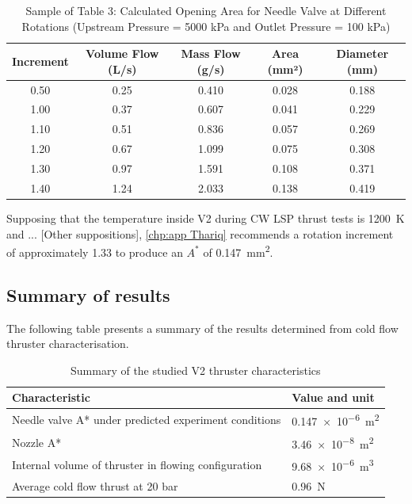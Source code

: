             \begin{table}[!ht]
                \centering
                \caption{Sample of Table 3: Calculated Opening Area for Needle Valve at Different Rotations (Upstream Pressure = 5000 kPa and Outlet Pressure = 100 kPa)}
                \label{tab:opening_area}
                \begin{tabular}{|c|c|c|c|c|}
                \hline
                \textbf{Increment} & \textbf{Volume Flow (L/s)} & \textbf{Mass Flow (g/s)} & \textbf{Area (mm²)} & \textbf{Diameter (mm)} \\ \hline
                0.50 & 0.25 & 0.410 & 0.028 & 0.188 \\ \hline
                1.00 & 0.37 & 0.607 & 0.041 & 0.229 \\ \hline
                1.10 & 0.51 & 0.836 & 0.057 & 0.269 \\ \hline
                1.20 & 0.67 & 1.099 & 0.075 & 0.308 \\ \hline
                1.30 & 0.97 & 1.591 & 0.108 & 0.371 \\ \hline
                1.40 & 1.24 & 2.033 & 0.138 & 0.419 \\ \hline
                \end{tabular}
            \end{table}

            Supposing that the temperature inside V2 during CW LSP thrust tests is \qty{1200}{K} and ... [Other suppositions], \autoref{chp:app Thariq} recommends a rotation increment of approximately 1.33 to produce an $A^*$ of \qty{0.147}{mm^2}. 

        \subsection{Summary of results}

            The following table presents a summary of the results determined from cold flow thruster characterisation.

            \begin{table}[!ht]
                \centering
                \caption{Summary of the studied V2 thruster characteristics}
                \label{tab:characteristics}
                \begin{tabularx}{\textwidth}{XX}
                \toprule
                Characteristic                                          &     Value and unit          \\ \midrule
                Needle valve A* under predicted experiment conditions   &     \qty{0.147e-6}{m^2}     \\
                Nozzle A*                                               &     \qty{3.46e-8}{m^2}      \\
                Internal volume of thruster in flowing configuration    &     \qty{9.68e-6}{m^3}      \\
                Average cold flow thrust at 20 bar                      &     \qty{0.96}{N}           \\
                \bottomrule 
                \end{tabularx}
            \end{table}

